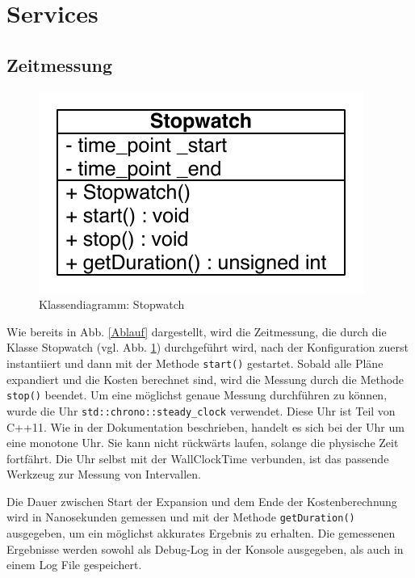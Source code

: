 \section{Services}
\subsection{Zeitmessung}

\begin{figure}[ht]
  \centering
  \includegraphics{04_Implementierung/00_media/Stopwatch.pdf}
  \caption{Klassendiagramm: Stopwatch}
  \label{ClassStopwatch}
\end{figure}

Wie bereits in Abb. \ref{Ablauf} dargestellt, wird die Zeitmessung, die durch die Klasse Stopwatch (vgl. Abb. \ref{ClassStopwatch}) durchgeführt wird, nach der Konfiguration zuerst instantiiert und dann mit der Methode \texttt{start()} gestartet. Sobald alle Pläne expandiert und die Kosten berechnet sind, wird die Messung durch die Methode \texttt{stop()} beendet. Um eine möglichst genaue Messung durchführen zu können, wurde die Uhr \texttt{std::chrono::steady\_clock} verwendet. Diese Uhr ist Teil von C++11. Wie in der Dokumentation \cite{cppreference_2015_clock} beschrieben, handelt es sich bei der Uhr um eine monotone Uhr. Sie kann nicht rückwärts laufen, solange die physische Zeit fortfährt. Die Uhr selbst mit der Wall\-Clock\-Time verbunden, ist das passende Werkzeug zur Messung von Intervallen. 

Die Dauer zwischen Start der Expansion und dem Ende der Kostenberechnung wird in Nanosekunden gemessen und mit der Methode \texttt{getDuration()} ausgegeben, um ein möglichst akkurates Ergebnis zu erhalten. Die gemessenen Ergebnisse werden sowohl als Debug-Log in der Konsole ausgegeben, als auch  in einem Log File gespeichert.




